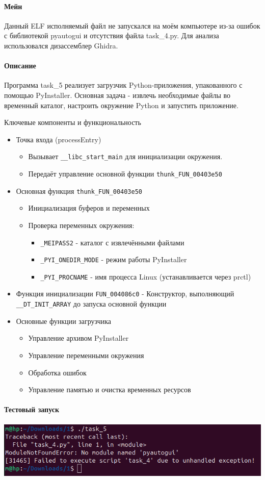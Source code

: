\paragraph{Мейн}

Данный ELF исполняемый файл не запускался на моём компьютере из-за ошибок с библиотекой pyautogui и
отсутствия файла task\_4.py.
Для анализа использовался дизассемблер Ghidra.

\paragraph{Описание}
Программа task\_5 реализует загрузчик Python-приложения, упакованного с помощью PyInstaller.
Основная задача - извлечь необходимые файлы во временный каталог, настроить окружение Python и запустить приложение.

Ключевые компоненты и функциональность
\begin{itemize}
    \item Точка входа (processEntry)
    \begin{itemize}
        \item Вызывает \texttt{\_\_libc\_start\_main} для инициализации окружения.
        \item Передаёт управление основной функции \texttt{thunk\_FUN\_00403e50}
    \end{itemize}
    \item Основная функция \texttt{thunk\_FUN\_00403e50}
    \begin{itemize}
        \item Инициализация буферов и переменных
        \item Проверка переменных окружения:
        \begin{itemize}
            \item \texttt{\_MEIPASS2} - каталог с извлечёнными файлами
            \item \texttt{\_PYI\_ONEDIR\_MODE} - режим работы PyInstaller
            \item \texttt{\_PYI\_PROCNAME} - имя процесса Linux (устанавливается через prctl)
        \end{itemize}
    \end{itemize}
    \item Функция инициализации \texttt{FUN\_004086c0} - Конструктор, выполняющий \texttt{\_\_DT\_INIT\_ARRAY}
    до запуска основной функции
    \item Основные функции загрузчика
    \begin{itemize}
        \item Управление архивом PyInstaller
        \item Управление переменными окружения
        \item Обработка ошибок
        \item Управление памятью и очистка временных ресурсов
    \end{itemize}

\end{itemize}

\paragraph{Тестовый запуск}
\includegraphics[width=1\linewidth]{static/_task_5}
